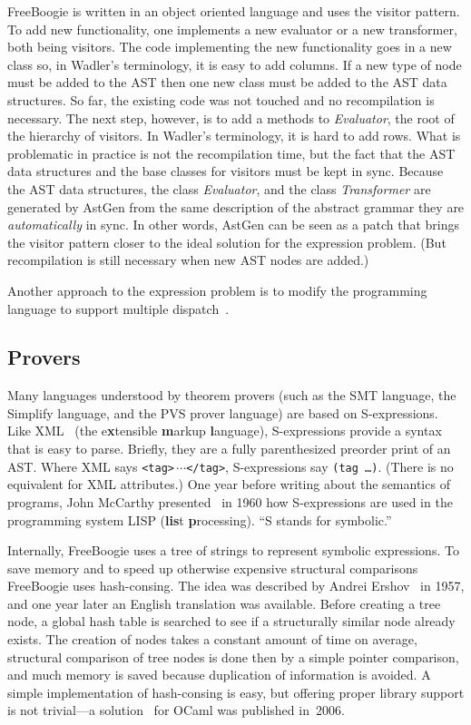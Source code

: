 \documentclass{llncs}
\def\fb#1{{\bf #1}} %
\begin{document}
FreeBoogie is written in an object oriented language and uses
the visitor pattern. To add new functionality, one implements a
new evaluator or a new transformer, both being visitors. The
code implementing the new functionality goes in a new class so,
in Wadler's terminology, it is easy to add columns. If a new
type of node must be added to the AST then one new class must
be added to the AST data structures. So far, the existing code
was not touched and no recompilation is necessary. The next
step, however, is to add a methods to \textit{Evaluator}, the
root of the hierarchy of visitors. In Wadler's terminology, it
is hard to add rows. What is problematic in practice is not the
recompilation time, but the fact that the AST data structures
and the base classes for visitors must be kept in sync. Because
the AST data structures, the class \textit{Evaluator}, and the
class \textit{Transformer} are generated by AstGen from the same
description of the abstract grammar they are \emph{automatically}
in sync. In other words, AstGen can be seen as a patch that
brings the visitor pattern closer to the ideal solution for the
expression problem. (But recompilation is still necessary when
new AST nodes are added.)

Another approach to the expression problem is to
modify the programming language to support multiple
dispatch~\cite{chambers1994mm,clifton2006}.

\subsection{Provers}

Many languages understood by theorem provers (such as the SMT
language, the Simplify language, and the PVS prover language)
are based on S-expressions. Like XML~\cite{bray2006xml} (the
e\textbf{x}tensible \fb markup \fb language), S-expressions
provide a syntax that is easy to parse. Briefly, they are a fully
parenthesized preorder print of an AST\null. Where XML says
\texttt{<tag>$\,\cdots$</tag>}, S-expressions say \texttt{(tag
\dots)}. (There is no equivalent for XML attributes.) One year
before writing about the semantics of programs, John McCarthy
presented~\cite{mccarthy1960} in 1960 how S-expressions are used
in the programming system LISP (\textbf{lis}t \fb processing).
``S stands for symbolic.''

Internally, FreeBoogie uses a tree of strings to represent
symbolic expressions. To save memory and to speed up otherwise
expensive structural comparisons FreeBoogie uses hash-consing.
The idea was described by Andrei Ershov~\cite{ershov1958} in
1957, and one year later an English translation was available.
Before creating a tree node, a global hash table is searched to
see if a structurally similar node already exists. The creation
of nodes takes a constant amount of time on average, structural
comparison of tree nodes is done then by a simple pointer
comparison, and much memory is saved because duplication of
information is avoided. A simple implementation of hash-consing
is easy, but offering proper library support is not trivial---a
solution~\cite{filliatre2006hash} for OCaml was published
in~2006.
\end{document}
